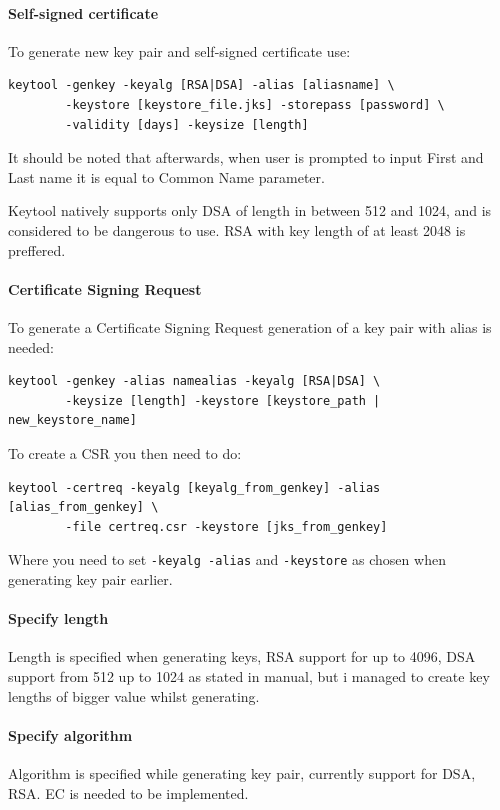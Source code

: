 \documentclass[10pt, a4paper]{report}
\begin{document}
{      \paragraph{Self-signed certificate}
To generate new key pair and self-signed certificate use:
\begin{verbatim}
keytool -genkey -keyalg [RSA|DSA] -alias [aliasname] \
        -keystore [keystore_file.jks] -storepass [password] \
        -validity [days] -keysize [length]
\end{verbatim}

It should be noted that afterwards, when user is prompted to input First and Last name it is equal to Common Name parameter.

Keytool natively supports only DSA of length in between 512 and 1024, and is considered to be dangerous to use. RSA with key length of at least 2048 is preffered.

      \paragraph{Certificate Signing Request}
To generate a Certificate Signing Request generation of a key pair with alias is needed:
\begin{verbatim}
keytool -genkey -alias namealias -keyalg [RSA|DSA] \
        -keysize [length] -keystore [keystore_path | new_keystore_name]
\end{verbatim}
To create a CSR you then need to do:
\begin{verbatim}
keytool -certreq -keyalg [keyalg_from_genkey] -alias [alias_from_genkey] \
        -file certreq.csr -keystore [jks_from_genkey]
\end{verbatim}
Where you need to set \verb+-keyalg -alias+ and \verb+-keystore+ as chosen when generating key pair earlier.

      \paragraph{Specify length}
Length is specified when generating keys, RSA support for up to 4096, DSA support from 512 up to 1024 as stated in manual, but i managed to create key lengths of bigger value whilst generating.

      \paragraph{Specify algorithm}
Algorithm is specified while generating key pair, currently support for DSA, RSA. EC is needed to be implemented.      

}
\end{document}
